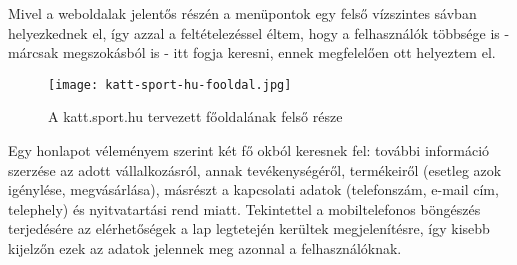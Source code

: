 Mivel a weboldalak jelentős részén a menüpontok egy felső vízszintes sávban helyezkednek el, így azzal a feltételezéssel éltem, hogy a felhasználók többsége is - márcsak megszokásból is - itt fogja keresni, ennek megfelelően ott helyeztem el.

\begin{figure}[H]
	\texttt{[image: katt-sport-hu-fooldal.jpg]}
	\caption{A katt.sport.hu tervezett főoldalának felső része}
\end{figure}

\newpage

Egy honlapot véleményem szerint két fő okból keresnek fel: további információ szerzése az adott vállalkozásról, annak tevékenységéről, termékeiről (esetleg azok igénylése, megvásárlása), másrészt a kapcsolati adatok (telefonszám, e-mail cím, telephely) és nyitvatartási rend miatt. Tekintettel a mobiltelefonos böngészés terjedésére az elérhetőségek a lap legtetején kerültek megjelenítésre, így kisebb kijelzőn ezek az adatok jelennek meg azonnal a felhasználóknak.